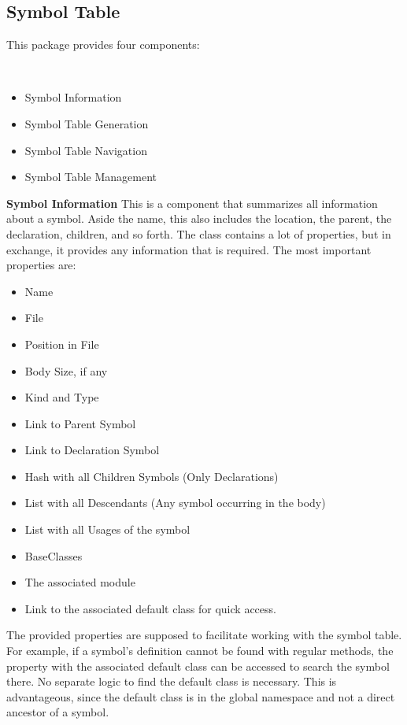 \subsection{Symbol Table}
This package provides four components:

\\

\begin{itemize}
    \item Symbol Information
    \item Symbol Table Generation
    \item Symbol Table Navigation
    \item Symbol Table Management
\end{itemize}

\textbf{Symbol Information}
This is a component that summarizes all information about a symbol.
Aside the name, this also includes the location, the parent, the declaration, children, and so forth.
The class contains a lot of properties, but in exchange, it provides any information that is required.
The most important properties are:
\begin{itemize}
    \item Name
    \item File
    \item Position in File
    \item Body Size, if any
    \item Kind and Type
    \item Link to Parent Symbol
    \item Link to Declaration Symbol
    \item Hash with all Children Symbols (Only Declarations)
    \item List with all Descendants (Any symbol occurring in the body)
    \item List with all Usages of the symbol
    \item BaseClasses
    \item The associated module
    \item Link to the associated default class for quick access.
\end{itemize}
The provided properties are supposed to facilitate working with the symbol table.
For example, if a symbol's definition cannot be found with regular methods, the property with the associated default class can be accessed to search the symbol there.
No separate logic to find the default class is necessary.
This is advantageous, since the default class is in the global namespace and not a direct ancestor of a symbol.\\

